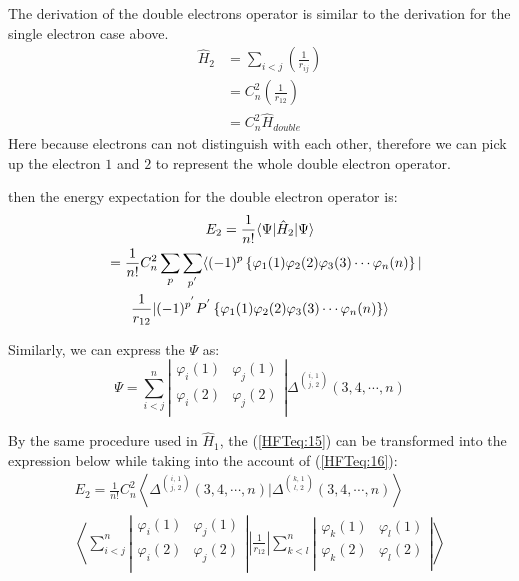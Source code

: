 The derivation of the double electrons operator is similar to the
derivation for the single electron case above.
\begin{align}\label{}
\hat{H}_{2} &= \sum_{i<j}(\frac{1}{r_{ij}}) \nonumber \\
&=C^{2}_{n}(\frac{1}{r_{12}}) \nonumber \\
&=C^{2}_{n}\hat{H}_{double}
\end{align}
Here because electrons can not distinguish with each other,
therefore we can pick up the electron $1$ and $2$ to represent the
whole double electron operator.

then the energy expectation for the double electron operator is:
\begin{multline}\label{HFTeq:15}
  E_{2}=\frac{1}{n!}\langle\Psi|\hat{H}_{2}|\Psi\rangle \\
  \shoveleft{=\frac{1}{n!}C^{2}_{n}\sum_{p}\sum_{p^{'}}
  \langle
  (-1)^{p} \left \{\varphi_{1}(1)\varphi_{2}(2)\varphi_{3}(3)\cdots\varphi_{n}(n)\right\} |} \\
  \frac{1}{r_{12}}|
  (-1)^{p^{'}}P^{'}
           \left\{\varphi_{1}(1)\varphi_{2}(2)\varphi_{3}(3)\cdots\varphi_{n}(n)\right\}
\rangle
\end{multline}

Similarly, we can express the $\Psi$ as:
\begin{equation}\label{HFTeq:16}
\Psi = \sum^{n}_{i<j}\left|
                       \begin{array}{cc}
                         \varphi_{i}(1) & \varphi_{j}(1) \\
                         \varphi_{i}(2) & \varphi_{j}(2) \\
                       \end{array}
                     \right|
\Delta^{
            i,\,1 \choose
            j,\,2 }
(3,4,\cdots,n)
\end{equation}

By the same procedure used in $\hat{H}_{1}$, the (\ref{HFTeq:15})
can be transformed into the expression below while taking into the
account of (\ref{HFTeq:16}):
\begin{multline}\label{HFTeq:17}
 E_{2}=\frac{1}{n!}C^{2}_{n} \left
 \langle
\Delta^{
            i,\,1 \choose
            j,\,2 }
(3,4,\cdots,n) |
\Delta^{
            k,\,1 \choose
            l,\,2 }
(3,4,\cdots,n) \right\rangle  \\
\left\langle \sum^{n}_{i<j}
 \left|
 \begin{array}{cc}
 \varphi_{i}(1) & \varphi_{j}(1) \\
 \varphi_{i}(2) & \varphi_{j}(2) \\
 \end{array} \right|
 \left |\frac{1}{r_{12}} \right|
 \sum^{n}_{k<l}
  \left|
 \begin{array}{cc}
 \varphi_{k}(1) & \varphi_{l}(1) \\
 \varphi_{k}(2) & \varphi_{l}(2) \\
 \end{array}
 \right|
 \right\rangle
\end{multline}

